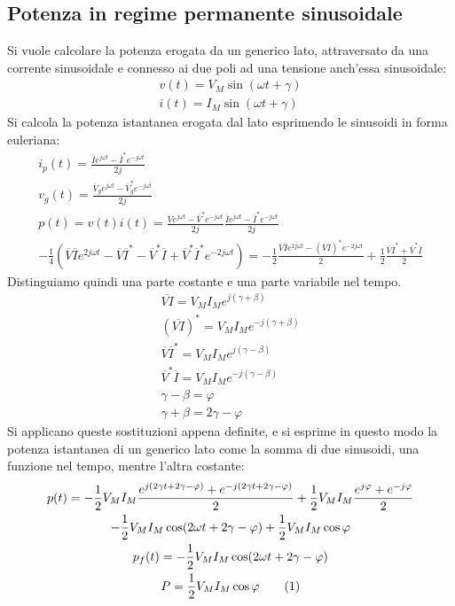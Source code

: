 \documentclass{article}
\newcommand{\tageq}{\tag{\stepcounter{equation}\theequation}}
\numberwithin{equation}{subsection}
\begin{document}
\subsection{Potenza in regime permanente sinusoidale}
Si vuole calcolare la potenza erogata da un generico lato, attraversato da una corrente sinusoidale e connesso ai due poli ad una tensione anch'essa sinusoidale:
\begin{gather*}
    v(t)=V_M\sin(\omega t+\gamma)\\
    i(t)=I_M\sin(\omega t+\gamma)
\end{gather*}
Si calcola la potenza istantanea erogata dal lato esprimendo le sinusoidi in forma euleriana:
\begin{gather*}
    i_p(t)=\displaystyle\frac{\overline{I}e^{j\omega t}-\overline{I}^*e^{-j\omega t}}{2j}\\
    v_{g}(t)=\displaystyle\frac{\overline{V}_ge^{j\omega t}-\overline{V}_g^*e^{-j\omega t}}{2j}\\
    p(t)=v(t)i(t)=\displaystyle\frac{\overline{V}e^{j\omega t}-\overline{V}^*e^{-j\omega t}}{2j}\frac{\overline{I}e^{j\omega t}-\overline{I}^*e^{-j\omega t}}{2j}\\
    \displaystyle-\frac{1}{4}\left(\overline{V}\overline{I}e^{2j\omega t}-\overline{V}\overline{I}^*-\overline{V}^*\overline{I}+\overline{V}^*\overline{I}^*e^{-2j\omega t}\right)
    =-\frac{1}{2}\frac{\overline{V}\overline{I}e^{2j\omega t}-(\overline{V}\overline{I})^*e^{-2j\omega t}}{2}+\frac{1}{2}\frac{\overline{V}\overline{I}^*+\overline{V}^*\overline{I}}{2}
\end{gather*}
Distinguiamo quindi una parte costante e una parte variabile nel tempo.
\begin{gather*}
    \overline{VI}=V_MI_Me^{j(\gamma+\beta)}\\
     (\overline{VI})^*=V_MI_Me^{-j(\gamma+\beta)}\\
    \overline{V}\overline{I}^*=V_MI_Me^{j(\gamma-\beta)}\\
    \overline{V}^*\overline{I}=V_MI_Me^{-j(\gamma-\beta)}\\
    \gamma-\beta=\varphi\\
    \gamma+\beta=2\gamma-\varphi
\end{gather*}
Si applicano queste sostituzioni appena definite, e si esprime in questo modo la potenza istantanea di un generico lato come la somma di due sinusoidi, una funzione nel tempo, 
mentre l'altra costante:
\begin{gather*}
    p(t)=\displaystyle-\frac{1}{2}V_MI_M\frac{e^{j(2\gamma t+2\gamma-\varphi)}+e^{-j(2\gamma t+2\gamma-\varphi)}}{2}+\frac{1}{2}V_MI_M\frac{e^{j\varphi}+e^{-j\varphi}}{2}\\
    -\displaystyle\frac{1}{2}V_MI_M\cos(2\omega t+2\gamma-\varphi)+\frac{1}{2}V_MI_M\cos\varphi\\
    p_f(t)=-\displaystyle\frac{1}{2}V_MI_M\cos(2\omega t+2\gamma-\varphi)\\
    P=\displaystyle\frac{1}{2}V_MI_M\cos\varphi\tageq
\end{gather*}
\end{document}
